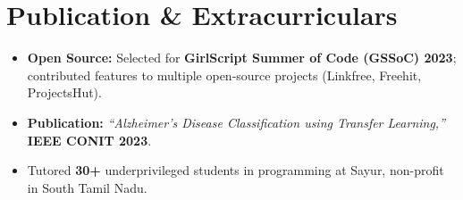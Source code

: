 \documentclass[letterpaper,10pt]{article}
\begin{document}
\section{Publication \& Extracurriculars}
\begin{itemize}[leftmargin=0.18in, itemsep=0pt, topsep=1pt]
  \item\small \textbf{Open Source:} Selected for \textbf{GirlScript Summer of Code (GSSoC) 2023}; contributed features to multiple open-source projects (Linkfree, Freehit, ProjectsHut).
  \item\small \textbf{Publication:} \textit{``Alzheimer's Disease Classification using Transfer Learning,''} \textbf{IEEE CONIT 2023}.
  \item\small Tutored \textbf{30+} underprivileged students in programming at Sayur, non-profit in South Tamil Nadu.
\end{itemize}
\vspace{-6pt}
\end{document}
